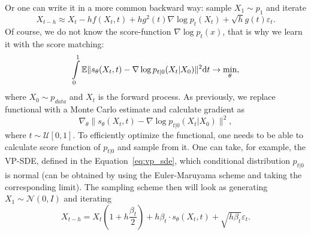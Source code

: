 Or one can write it in a more common backward way: sample $X_1 \sim p_1$ and iterate
\[
    X_{t - h} \approx X_t - h f(X_t, t) + h g^2(t) \nabla \log p_t(X_t) + \sqrt{h} g(t) \varepsilon_t.
\]
Of course, we do not know the score-function $\nabla \log p_t(x)$, that is why we learn it with the score matching:
\[
    \int\limits_{0}^{1} \mathbb{E} \| s_\theta(X_t, t) - \nabla \log p_{t | 0}(X_t | X_0) \|^2 \mathrm{d} t \rightarrow \min\limits_{\theta},
\]
where $X_0 \sim p_{data}$ and $X_t$ is the forward process. As previously, we replace functional with a Monte Carlo estimate and calculate gradient as
\[
    \nabla_{\theta} \|s_\theta(X_t, t) - \nabla \log p_{t | 0}(X_t | X_0) \|^2,
\]
where $t \sim \mathcal{U}[0, 1]$. To efficiently optimize the functional, one needs to be able to calculate score function of $p_{t | 0}$ and sample from it. One can take, for example, the VP-SDE, defined in the Equation~\ref{eq:vp_sde}, which conditional distribution $p_{t | 0}$ is normal (can be obtained by using the Euler-Maruyama scheme and taking the corresponding limit). The sampling scheme then will look as generating $X_1 \sim \mathcal{N}(0, I)$ and iterating
\[
    X_{t - h} = X_t\left(1 + h \frac{\beta_t}{2}\right) + h \beta_t \cdot  s_\theta(X_t, t) + \sqrt{h \beta_t} \varepsilon_t.
\]


